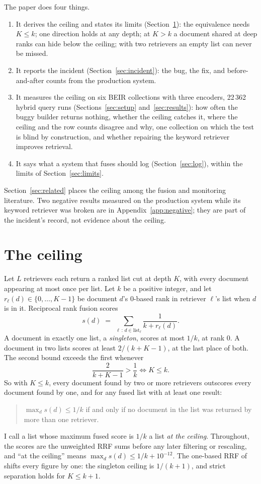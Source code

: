\documentclass[11pt]{article}
\begin{document}
The paper does four things.
\begin{enumerate}
\item It derives the ceiling and states its limits (Section~\ref{sec:ceiling}): the equivalence needs $K \le k$; one direction holds at any depth; at $K > k$ a document shared at deep ranks can hide below the ceiling; with two retrievers an empty list can never be missed.
\item It reports the incident (Section~\ref{sec:incident}): the bug, the fix, and before-and-after counts from the production system.
\item It measures the ceiling on six BEIR collections with three encoders, 22\,362 hybrid query runs (Sections~\ref{sec:setup} and~\ref{sec:results}): how often the buggy builder returns nothing, whether the ceiling catches it, where the ceiling and the row counts disagree and why, one collection on which the test is blind by construction, and whether repairing the keyword retriever improves retrieval.
\item It says what a system that fuses should log (Section~\ref{sec:log}), within the limits of Section~\ref{sec:limits}.
\end{enumerate}
Section~\ref{sec:related} places the ceiling among the fusion and monitoring literature. Two negative results measured on the production system while its keyword retriever was broken are in Appendix~\ref{app:negative}; they are part of the incident's record, not evidence about the ceiling.

\section{The ceiling}
\label{sec:ceiling}

Let $L$ retrievers each return a ranked list cut at depth $K$, with every document appearing at most once per list. Let $k$ be a positive integer, and let $r_\ell(d) \in \{0, \ldots, K-1\}$ be document $d$'s 0-based rank in retriever $\ell$'s list when $d$ is in it. Reciprocal rank fusion scores
\[
  s(d) \;=\; \sum_{\ell \,:\, d \in \text{list}_\ell} \frac{1}{k + r_\ell(d)} .
\]
A document in exactly one list, a \emph{singleton}, scores at most $1/k$, at rank 0. A document in two lists scores at least $2/(k+K-1)$, at the last place of both. The second bound exceeds the first whenever
\[
  \frac{2}{k+K-1} > \frac{1}{k} \iff K \le k .
\]
So with $K \le k$, every document found by two or more retrievers outscores every document found by one, and for any fused list with at least one result:
\begin{quote}
$\max_d s(d) \le 1/k$ if and only if no document in the list was returned by more than one retriever.
\end{quote}
I call a list whose maximum fused score is $1/k$ a list \emph{at the ceiling}. Throughout, the scores are the unweighted RRF sums before any later filtering or rescaling, and ``at the ceiling'' means $\max_d s(d) \le 1/k + 10^{-12}$. The one-based RRF of \citet{cormack2009rrf} shifts every figure by one: the singleton ceiling is $1/(k+1)$, and strict separation holds for $K \le k+1$.
\end{document}
